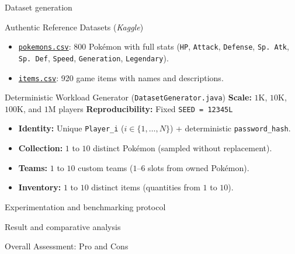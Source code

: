 \documentclass{beamer}
\begin{document}
\begin{frame}{Dataset generation}
    \small
    \begin{block}{\normalsize Authentic Reference Datasets (\textit{Kaggle})}
        \begin{itemize}
            \item \texttt{\href{https://www.kaggle.com/datasets/mlomuscio/pokemon}{pokemons.csv}}: 800 Pokémon with full stats (\texttt{HP}, \texttt{Attack}, \texttt{Defense}, \texttt{Sp. Atk}, \texttt{Sp. Def}, \texttt{Speed}, \texttt{Generation}, \texttt{Legendary}).
            \item \texttt{\href{https://www.kaggle.com/datasets/mylesoneill/pokemon-sun-and-moon-gen-7-stats?select=items.csv}{items.csv}}: 920 game items with names and descriptions.
        \end{itemize}
    \end{block}

    \begin{block}{\normalsize Deterministic Workload Generator (\texttt{DatasetGenerator.java})}
        \textbf{Scale:} $1\text{K}$, $10\text{K}$, $100\text{K}$, and $1\text{M}$ players \hfill \textbf{Reproducibility:} Fixed \texttt{SEED = 12345L}
        \begin{itemize}
            \item \textbf{Identity:} Unique \texttt{Player\_i} ($i \in \{1, \dots, N\}$) + deterministic \texttt{password\_hash}.
            \item \textbf{Collection:} $1$ to $10$ distinct Pokémon (sampled without replacement).
            \item \textbf{Teams:} $1$ to $10$ custom teams ($1$–$6$ slots from owned Pokémon).
            \item \textbf{Inventory:} $1$ to $10$ distinct items (quantities from $1$ to $10$).
        \end{itemize}
    \end{block}
\end{frame}

\begin{frame}{Experimentation and benchmarking protocol}
\end{frame}

\begin{frame}{Result and comparative analysis}
\end{frame}

\begin{frame}{Overall Assessment: Pro and Cons}
\end{frame}
\end{document}
